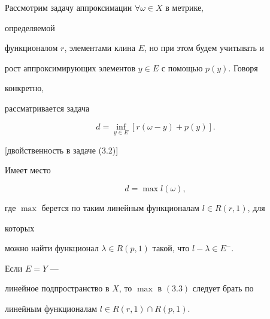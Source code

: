 Рассмотрим задачу аппроксимации $\forall\omega\in X$ в метрике, 


определяемой 


функционалом $r$, элементами клина $E$, но при этом будем учитывать и 


рост аппроксимирующих элементов $y\in E$ с помощью $p(y)$. Говоря 


конкретно, 


рассматривается задача 


\begin{equation} 


d=\inf_{y\in E}[r(\omega-y)+p(y)]. 


\end{equation} 


 


\begin{thms} 


[{\selectfont двойственность в задаче (3.2)}] 


Имеет место


\begin{equation} 


d=\max l(\omega), 


\end{equation} 


где $\max$ берется по таким линейным функционалам $l\in R(r,1)$, для 


которых 


можно найти функционал $\lambda\in R(p,1)$ такой, что $l-\lambda\in E^-$. 


Если $E=Y$ --- 


линейное подпространство в $X$, то $\max$ в $(3.3)$ следует брать по 


линейным функционалам $l\in R(r,1)\cap R(p,1)$. 


\end{thms} 


 


